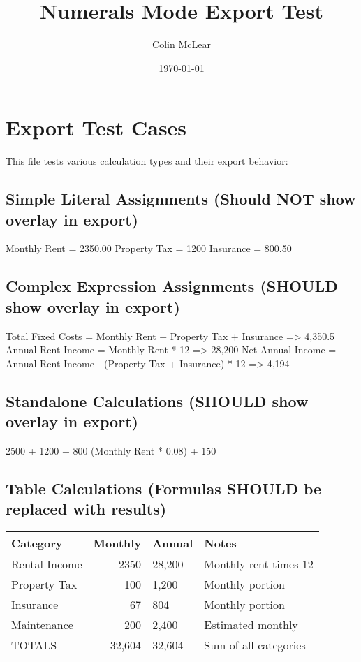 \documentclass[11pt]{article}
\author{Colin McLear}
\date{\today}
\title{Numerals Mode Export Test}
\begin{document}
\maketitle
\tableofcontents

\section{Export Test Cases}
\label{sec:orgf860b90}

This file tests various calculation types and their export behavior:
\subsection{Simple Literal Assignments (Should NOT show overlay in export)}
\label{sec:org0a2c030}

Monthly Rent = 2350.00
Property Tax = 1200
Insurance = 800.50
\subsection{Complex Expression Assignments (SHOULD show overlay in export)}
\label{sec:org996ea80}

Total Fixed Costs = Monthly Rent + Property Tax + Insurance => 4,350.5
Annual Rent Income = Monthly Rent * 12 => 28,200
Net Annual Income = Annual Rent Income - (Property Tax + Insurance) * 12 => 4,194
\subsection{Standalone Calculations (SHOULD show overlay in export)}
\label{sec:org47cc3c2}

2500 + 1200 + 800
(Monthly Rent * 0.08) + 150
\subsection{Table Calculations (Formulas SHOULD be replaced with results)}
\label{sec:org66bf102}

\begin{table}[htbp]
\label{tab:orgab45c73}
\centering
\begin{tabular}{lrll}
Category & Monthly & Annual & Notes\\
\hline
Rental Income & 2350 & 28,200 & Monthly rent times 12\\
Property Tax & 100 & 1,200 & Monthly portion\\
Insurance & 67 & 804 & Monthly portion\\
Maintenance & 200 & 2,400 & Estimated monthly\\
TOTALS & 32,604 & 32,604 & Sum of all categories\\
\end{tabular}
\end{table}
\end{document}
